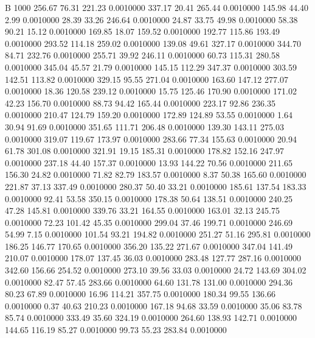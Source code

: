 


B 1000
 256.67   76.31  221.23   0.0010000
 337.17   20.41  265.44   0.0010000
 145.98   44.40    2.99   0.0010000
  28.39   33.26  246.64   0.0010000
  24.87   33.75   49.98   0.0010000
  58.38   90.21   15.12   0.0010000
 169.85   18.07  159.52   0.0010000
 192.77  115.86  193.49   0.0010000
 293.52  114.18  259.02   0.0010000
 139.08   49.61  327.17   0.0010000
 344.70   84.71  232.76   0.0010000
 255.71   39.92  246.11   0.0010000
  60.73  115.31  280.58   0.0010000
 345.04   45.57   21.79   0.0010000
 145.15  112.29  347.37   0.0010000
 303.59  142.51  113.82   0.0010000
 329.15   95.55  271.04   0.0010000
 163.60  147.12  277.07   0.0010000
  18.36  120.58  239.12   0.0010000
  15.75  125.46  170.90   0.0010000
 171.02   42.23  156.70   0.0010000
  88.73   94.42  165.44   0.0010000
 223.17   92.86  236.35   0.0010000
 210.47  124.79  159.20   0.0010000
 172.89  124.89   53.55   0.0010000
   1.64   30.94   91.69   0.0010000
 351.65  111.71  206.48   0.0010000
 139.30  143.11  275.03   0.0010000
 319.07  119.67  173.97   0.0010000
 283.66   77.34  155.63   0.0010000
  20.94   61.78  301.08   0.0010000
 321.91   19.15  185.31   0.0010000
 178.82  152.16  247.97   0.0010000
 237.18   44.40  157.37   0.0010000
  13.93  144.22   70.56   0.0010000
 211.65  156.30   24.82   0.0010000
  71.82   82.79  183.57   0.0010000
   8.37   50.38  165.60   0.0010000
 221.87   37.13  337.49   0.0010000
 280.37   50.40   33.21   0.0010000
 185.61  137.54  183.33   0.0010000
  92.41   53.58  350.15   0.0010000
 178.38   50.64  138.51   0.0010000
 240.25   47.28  145.81   0.0010000
 339.76   33.21  164.55   0.0010000
 163.01   32.13  245.75   0.0010000
  72.23  101.42   45.35   0.0010000
 299.04   37.46  199.71   0.0010000
 246.69   54.99    7.15   0.0010000
 101.54   93.21  194.82   0.0010000
 251.27   51.16  295.81   0.0010000
 186.25  146.77  170.65   0.0010000
 356.20  135.22  271.67   0.0010000
 347.04  141.49  210.07   0.0010000
 178.07  137.45   36.03   0.0010000
 283.48  127.77  287.16   0.0010000
 342.60  156.66  254.52   0.0010000
 273.10   39.56   33.03   0.0010000
  24.72  143.69  304.02   0.0010000
  82.47   57.45  283.66   0.0010000
  64.60  131.78  131.00   0.0010000
 294.36   80.23   67.89   0.0010000
  16.96  114.21  357.75   0.0010000
 180.34   99.55  136.66   0.0010000
   0.37   40.63  210.23   0.0010000
 167.18   94.68   33.59   0.0010000
  35.06   83.78   85.74   0.0010000
 333.49   35.60  324.19   0.0010000
 264.60  138.93  142.71   0.0010000
 144.65  116.19   85.27   0.0010000
  99.73   55.23  283.84   0.0010000
